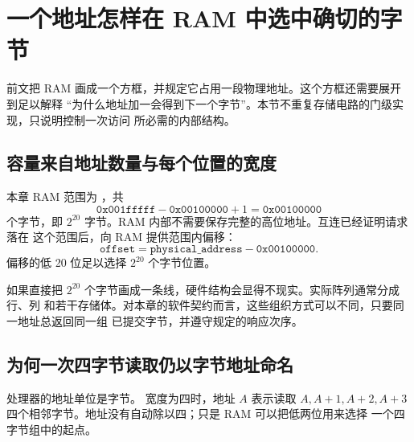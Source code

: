 \section{一个地址怎样在 RAM 中选中确切的字节}

前文把 RAM 画成一个方框，并规定它占用一段物理地址。这个方框还需要展开到足以解释
“为什么地址加一会得到下一个字节”。本节不重复存储电路的门级实现，只说明控制一次访问
所必需的内部结构。

\subsection{容量来自地址数量与每个位置的宽度}

本章 RAM 范围为 ，共
\[
\texttt{0x001fffff}-\texttt{0x00100000}+1=\texttt{0x00100000}
\]
个字节，即 \(2^{20}\) 字节。RAM 内部不需要保存完整的高位地址。互连已经证明请求落在
这个范围后，向 RAM 提供范围内偏移：
\[
\texttt{offset}=\texttt{physical\_address}-\texttt{0x00100000}.
\]
偏移的低 20 位足以选择 \(2^{20}\) 个字节位置。

\begin{center}
\end{center}

如果直接把 \(2^{20}\) 个字节画成一条线，硬件结构会显得不现实。实际阵列通常分成行、列
和若干存储体。对本章的软件契约而言，这些组织方式可以不同，只要同一地址总返回同一组
已提交字节，并遵守规定的响应次序。

\subsection{为何一次四字节读取仍以字节地址命名}

处理器的地址单位是字节。 宽度为四时，地址 \(A\) 表示读取
\(A,A+1,A+2,A+3\) 四个相邻字节。地址没有自动除以四；只是 RAM 可以把低两位用来选择
一个四字节组中的起点。

